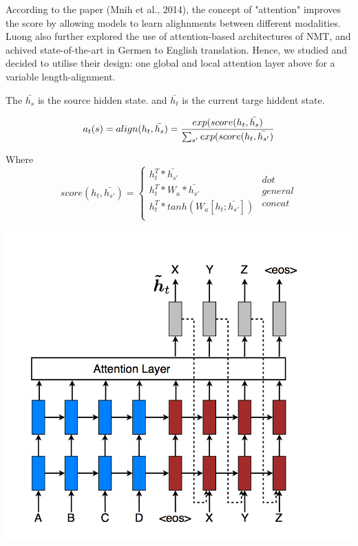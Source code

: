 \documentclass[11pt,letterpaper]{article}
\begin{document}
According to the paper (Mnih et al., 2014), the concept of "attention" improves the score by allowing models to learn alighnments between different modalities. Luong also further explored the use of attention-based architectures of NMT, and achived state-of-the-art in Germen to English translation. Hence, we studied and decided to utilise their design: one global and local attention layer above for a variable length-alignment.



The $\bar{h_s}$ is the source hidden state. 
and $\bar{h_t}$ is the current targe hiddent state.

$$a_t(s)=align(h_t, \bar{h_s})\\
=\frac{exp(score(h_t, \bar{h_s})}{\sum_{s'}exp(score(h_t, \bar{h_{s'}})}$$

Where
\begin{equation}
 score(h_t, \bar{h_{s'}})=
\left\{
\begin{aligned}
h_{t}^{T} * \bar{h_{s'}}  \\
h_{t}^{T} * W_a * \bar{h_{s'}} \\
h_{t}^{T} * tanh(W_a[h_t; \bar{h_{s'}}]) \\ 
\end{aligned}
\right.
\begin{aligned}
dot \\
general\\
concat\\ 
\end{aligned}
\end{equation}

\includegraphics[width=\columnwidth]{attn_layer.png}
\end{document}
